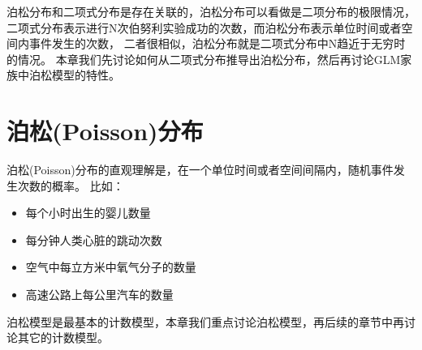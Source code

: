 \documentclass[letterpaper,10pt,english]{sphinxmanual}
\begin{document}
泊松分布和二项式分布是存在关联的，泊松分布可以看做是二项分布的极限情况，
二项式分布表示进行N次伯努利实验成功的次数，而泊松分布表示单位时间或者空间内事件发生的次数，
二者很相似，泊松分布就是二项式分布中N趋近于无穷时的情况。
本章我们先讨论如何从二项式分布推导出泊松分布，然后再讨论GLM家族中泊松模型的特性。


\section{泊松(Poisson)分布}
\label{\detokenize{_u6cca_u677e_u6a21_u578b/content:poisson}}
泊松(Poisson)分布的直观理解是，在一个单位时间或者空间间隔内，随机事件发生次数的概率。
比如：
\begin{itemize}
\item {} 
每个小时出生的婴儿数量

\item {} 
每分钟人类心脏的跳动次数

\item {} 
空气中每立方米中氧气分子的数量

\item {} 
高速公路上每公里汽车的数量

\end{itemize}

泊松模型是最基本的计数模型，本章我们重点讨论泊松模型，再后续的章节中再讨论其它的计数模型。
\end{document}
